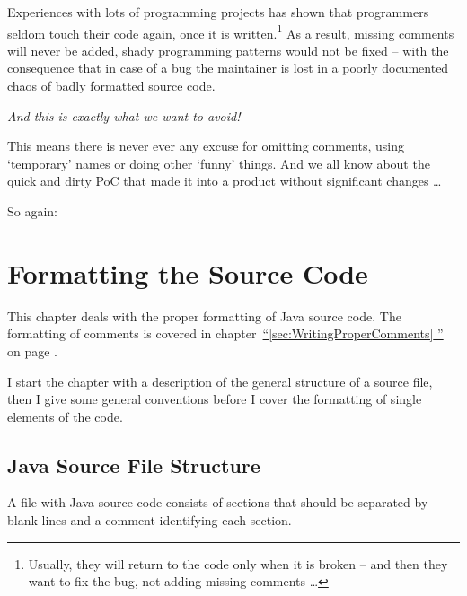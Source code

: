 \documentclass[12pt,a4paper,titlepage, parskip=half, headsepline, footsepline, cleardoubleplain]{scrbook}
\newcommand*{\tqfullvref}[1]{\hyperref[{#1}]{“\ref*{#1} \nameref*{#1}”} on page \pageref{#1}}
\begin{document}
\begin{center}
\begin{huge}
\end{huge}
\end{center}

Experiences with lots of programming projects has shown that programmers seldom touch their code again, once it is written.\footnote{Usually, they will return to the code only when it is broken – and then they want to fix the bug, not adding missing comments …} As a result, missing comments will never be added, shady programming patterns would not be fixed – with the consequence that in case of a bug the maintainer is lost in a poorly documented chaos of badly formatted source code.

\textit{And this is exactly what we want to avoid!} 

This means there is never ever any excuse for omitting comments, using ‘temporary’ names or doing other ‘funny’ things. And we all know about the quick and dirty PoC that made it into a product without significant changes …

So again:

\begin{center}
\begin{huge}
\end{huge}
\end{center}

\chapter{Formatting the Source Code}\label{sec:FormattingTheSourceCode}
This chapter deals with the proper formatting of Java source code. The formatting of comments is covered in chapter~\tqfullvref{sec:WritingProperComments}.

I start the chapter with a description of the general structure of a source file, then I give some general conventions before I cover the formatting of single elements of the code.

\section{Java Source File Structure}
A file with Java source code consists of sections that should be separated by blank lines and a comment identifying each section.
\end{document}
